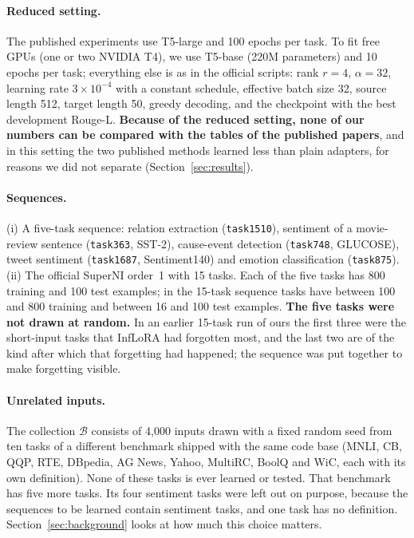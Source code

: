 \paragraph{Reduced setting.} The published experiments use T5-large and 100 epochs per task. To fit
free GPUs (one or two NVIDIA T4), we use T5-base \citep{raffel2020t5} (220M parameters) and 10 epochs
per task; everything else is as in the official scripts: rank $r = 4$, $\alpha = 32$, learning rate
$3 \times 10^{-4}$ with a constant schedule, effective batch size 32, source length 512, target
length 50, greedy decoding, and the checkpoint with the best development Rouge-L. \textbf{Because
of the reduced setting, none of our numbers can be compared with the tables of the published
papers}, and in this setting the two published methods learned less than plain adapters, for reasons we did not separate (Section~\ref{sec:results}).

\paragraph{Sequences.} (i) A five-task sequence: relation extraction (\texttt{task1510}), sentiment
of a movie-review sentence (\texttt{task363}, SST-2), cause-event detection (\texttt{task748},
GLUCOSE), tweet sentiment (\texttt{task1687}, Sentiment140) and emotion classification
(\texttt{task875}). (ii) The official SuperNI order~1 with 15 tasks. Each of the five tasks has 800
training and 100 test examples; in the 15-task sequence tasks have between 100 and 800 training and
between 16 and 100 test examples. \textbf{The five tasks were not drawn at random.} In an earlier
15-task run of ours the first three were the short-input tasks that InfLoRA had forgotten most, and
the last two are of the kind after which that forgetting had happened; the sequence was put
together to make forgetting visible.

\paragraph{Unrelated inputs.} The collection $\mathcal{B}$ consists of 4{,}000 inputs drawn with a
fixed random seed from ten tasks of a different benchmark shipped with the same code base (MNLI, CB,
QQP, RTE, DBpedia, AG News, Yahoo, MultiRC, BoolQ and WiC, each with its own definition). None of
these tasks is ever learned or tested. That benchmark has five more tasks. Its four sentiment tasks
were left out on purpose, because the sequences to be learned contain sentiment tasks, and one task
has no definition. Section~\ref{sec:background} looks at how much this choice matters.

